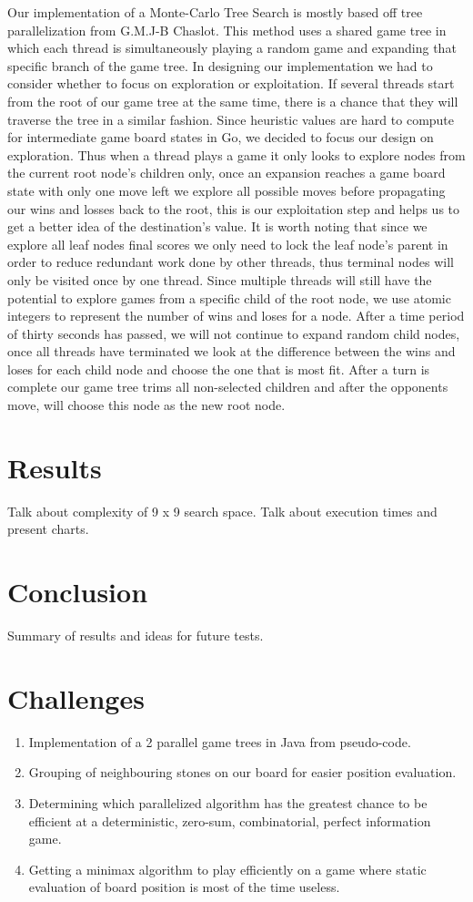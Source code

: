 \documentclass[conference]{IEEEtran}
\begin{document}
Our implementation of a Monte-Carlo Tree Search is mostly based off tree parallelization from G.M.J-B Chaslot. This method uses a shared game tree in which each thread is simultaneously playing a random game and expanding that specific branch of the game tree. In designing our implementation we had to consider whether to focus on exploration or exploitation.  If several threads start from the root of our game tree at the same time, there is a chance that they will traverse the tree in a similar fashion. Since heuristic values are hard to compute for intermediate game board states in Go, we decided to focus our design on exploration. Thus when a thread plays a game it only looks to explore nodes from the current root node's children only, once an expansion reaches a game board state with only one move left we explore all possible moves before propagating our wins and losses back to the root, this is our exploitation step and helps us to get a better idea of the destination's value. It is worth noting that since we explore all leaf nodes final scores we only need to lock the leaf node's parent in order to reduce redundant work done by other threads, thus terminal nodes will only be visited once by one thread. Since multiple threads will still have the potential to explore games from a specific child of the root node, we use atomic integers to represent the number of wins and loses for a node. After a time period of thirty seconds has passed, we will not continue to expand random child nodes, once all threads have terminated we look at the difference between the wins and loses for each child node and choose the one that is most fit. After a turn is complete our game tree trims all non-selected children and after the opponents move, will choose this node as the new root node.

\section{Results}
Talk about complexity of 9 x 9 search space.
Talk about execution times and present charts.

\section{Conclusion}
Summary of results and ideas for future tests.

\appendices
\section{Challenges}
\begin{enumerate}
  \item Implementation of a 2 parallel game trees in Java from pseudo-code.
  \item Grouping of neighbouring stones on our board for easier position evaluation.
  \item Determining which parallelized algorithm has the greatest chance to be efficient at a deterministic, zero-sum, combinatorial, perfect information game.
  \item Getting a minimax algorithm to play efficiently on a game where static evaluation of board position is most of the time useless.
\end{enumerate}
\end{document}
